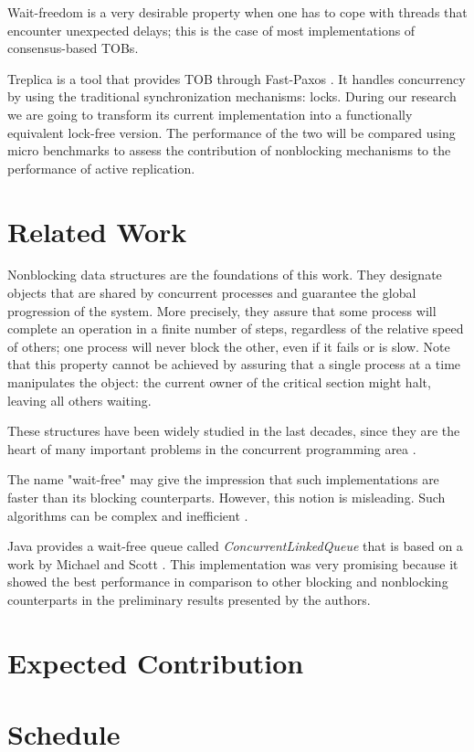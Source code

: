 \documentclass[12pt]{article}
\begin{document}
Wait-freedom is a very  desirable property when one has to cope with threads
that encounter unexpected delays; this  is the case
of  most  implementations of  consensus-based  TOBs.

Treplica \cite{vieira2008} is a tool that provides TOB through Fast-Paxos
\cite{Lamport2006}. It handles concurrency by using the traditional
synchronization mechanisms: locks. During our research we are going to transform
its current implementation  into a functionally equivalent lock-free version.
The  performance of the two will be compared using micro benchmarks to assess
the contribution  of nonblocking mechanisms to the  performance of active
replication.


\section{Related Work}
\label{sec:related}

Nonblocking data structures are the foundations of this work. They designate
objects that are shared by concurrent processes and guarantee the global
progression of the system. More precisely, they  assure that some process will
complete an operation in a finite number of steps, regardless of the relative
speed of others; one process will never block the other, even if it fails or is
slow. Note that this  property cannot be achieved by assuring that a single
process at a time manipulates the object: the current owner of the critical
section might halt, leaving all others waiting.

These structures have been widely studied in the last decades, since they are
the heart of many important problems in the concurrent programming area
\cite{herlihy2011art}.

The name "wait-free" may give the impression that such implementations are
faster than its blocking counterparts. However, this notion is misleading.  Such
algorithms can be complex and inefficient \cite{attiya1994wait}.

Java provides a wait-free queue called \textit{ConcurrentLinkedQueue} that is
based on a work by Michael and Scott \cite{michael1996simple}. This
implementation was very promising because it showed the best performance in
comparison to other blocking and nonblocking counterparts in the preliminary
results presented by the authors.


\section{Expected Contribution}
\label{sec:contrib}



\section{Schedule}
\label{sec:schedule}


\vskip 15mm

{}

\end{document}
